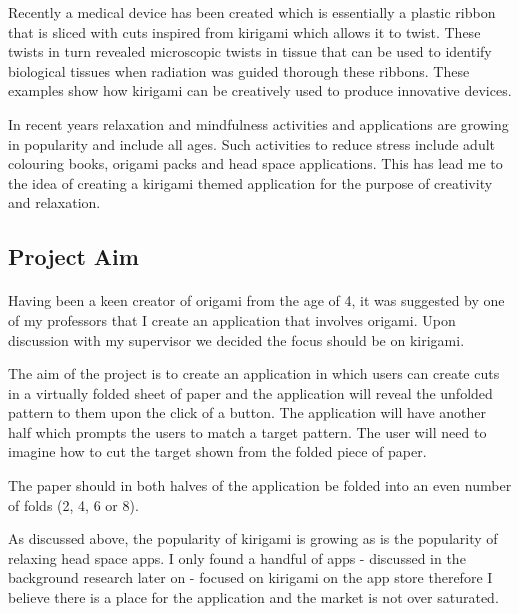 \documentclass[11pt]{article}
\begin{document}
                
               Recently a medical device has been created which is essentially a  plastic ribbon that is sliced with cuts inspired from kirigami which allows it to twist. These twists in turn revealed microscopic twists in tissue that can be used to identify biological tissues when radiation was guided thorough these ribbons. %
               These examples show how kirigami can be creatively used to produce innovative devices.
                
                In recent years relaxation and mindfulness activities and applications are growing in popularity and include all ages. Such activities to reduce stress include adult colouring books, origami packs and head space applications. This has lead me to the idea of creating a kirigami themed application for the purpose of creativity and relaxation.
    
            \subsection{Project Aim}
            
                 \paragraph{} 
                 
                  Having been a keen creator of origami from the age of 4, it was suggested by one of my professors that I create an application that involves origami. Upon discussion with my supervisor we decided the focus should be on kirigami. 
                  
                  The aim of the project is to create an application in which users can create cuts in a virtually folded sheet of paper and the application will reveal the unfolded pattern to them upon the click of a button. The application will have another half which prompts the users to match a target pattern. The user will need to imagine how to cut the target shown from the folded piece of paper.
                  
                  The paper should in both halves of the application be folded into an even number of folds (2, 4, 6 or 8).
                  
                  As discussed above, the popularity of kirigami is growing as is the popularity of relaxing head space apps. I only found a handful of apps - discussed in the background research later on - focused on kirigami on the app store therefore I believe there is a place for the application and the market is not over saturated.
                 
\end{document}
